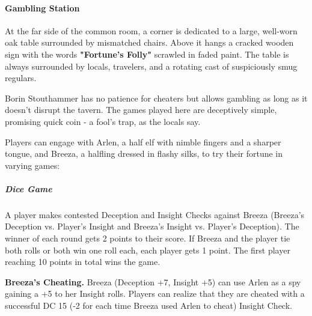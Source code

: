 {\entryfont \paragraph*{Gambling Station} At the far side of the common room, a corner is dedicated to a large, well-worn oak table surrounded by mismatched chairs. Above it hangs a cracked wooden sign with the words \textbf{"Fortune's Folly"} scrawled in faded paint. The table is always surrounded by locals, travelers, and a rotating cast of suspiciously smug regulars.

Borin Stouthammer has no patience for cheaters but allows gambling as long as it doesn't disrupt the tavern. The games played here are deceptively simple, promising quick coin - a fool's trap, as the locals say.

Players can engage with Arlen, a half elf with nimble fingers and a sharper tongue, and Breeza, a halfling dressed in flashy silks, to try their fortune in varying games:

\subparagraph*{Dice Game}
A player makes contested Deception and Insight Checks against Breeza (Breeza's Deception vs. Player's Insight and Breeza's Insight vs. Player's Deception).  The winner of each round gets 2 points to their score. If Breeza and the player tie both rolls or both win one roll each, each player gets 1 point. The first player reaching 10 points in total wins the game.

\noindent\textbf{Breeza's Cheating.} Breeza (Deception +7, Insight +5) can use Arlen as a spy gaining a +5 to her Insight rolls. Players can realize that they are cheated with a successful DC 15 (-2 for each time Breeza used Arlen to cheat) Insight Check.

}
